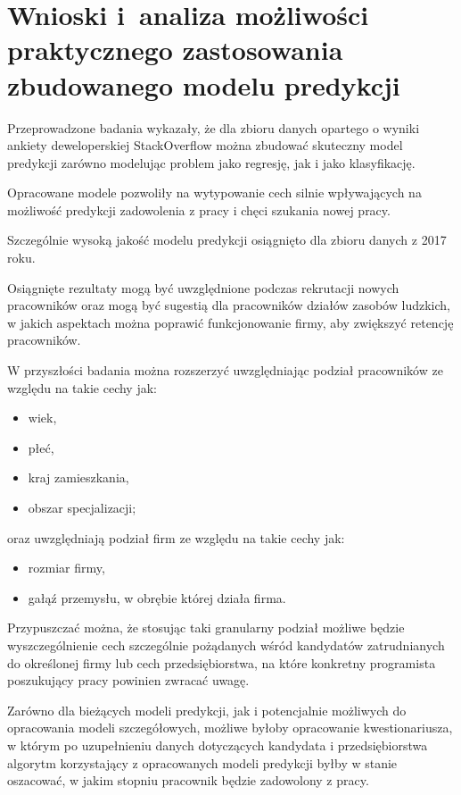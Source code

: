 \section{Wnioski i~analiza możliwości praktycznego zastosowania zbudowanego modelu predykcji}\label{sec:analysis:model-fitness}

Przeprowadzone badania wykazały, że dla zbioru danych opartego o wyniki ankiety deweloperskiej StackOverflow \cite{so-survey-info}
można zbudować skuteczny model predykcji zarówno modelując problem jako regresję, jak i jako klasyfikację.

Opracowane modele pozwoliły na wytypowanie cech silnie wpływających na możliwość predykcji zadowolenia z pracy i chęci szukania nowej pracy.

Szczególnie wysoką jakość modelu predykcji osiągnięto dla zbioru danych z 2017 roku.

Osiągnięte rezultaty mogą być uwzględnione podczas rekrutacji nowych pracowników
oraz mogą być sugestią dla pracowników działów zasobów ludzkich, w jakich aspektach można poprawić funkcjonowanie firmy, aby zwiększyć retencję pracowników.

W przyszłości badania można rozszerzyć uwzględniając podział pracowników ze względu na takie cechy jak:

\begin{itemize}
    \item wiek,
    \item płeć,
    \item kraj zamieszkania,
    \item obszar specjalizacji;
\end{itemize}

oraz uwzględniają podział firm ze względu na takie cechy jak:

\begin{itemize}
    \item rozmiar firmy,
    \item gałąź przemysłu, w obrębie której działa firma.
\end{itemize}

Przypuszczać można, że stosując taki granularny podział możliwe będzie wyszczególnienie cech szczególnie pożądanych wśród kandydatów zatrudnianych do określonej firmy
lub cech przedsiębiorstwa, na które konkretny programista poszukujący pracy powinien zwracać uwagę.

Zarówno dla bieżących modeli predykcji, jak i potencjalnie możliwych do opracowania modeli szczegółowych,
możliwe byłoby opracowanie kwestionariusza, w którym po uzupełnieniu danych dotyczących kandydata i przedsiębiorstwa
algorytm korzystający z opracowanych modeli predykcji byłby w stanie oszacować, w jakim stopniu pracownik będzie zadowolony z pracy.

\thispagestyle{normal}
